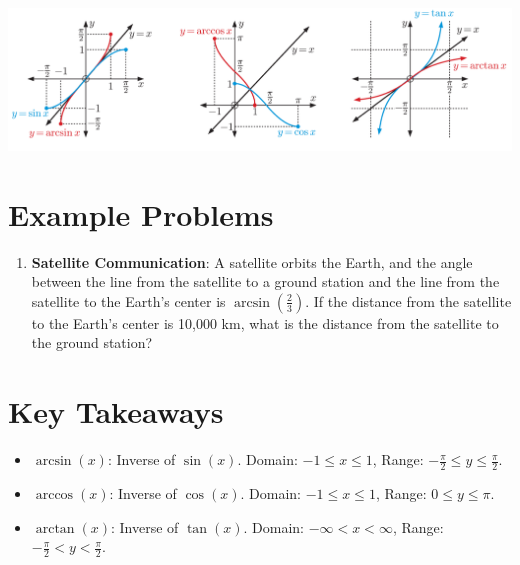 \documentclass{article}
\begin{document}
\begin{center}
\includegraphics[width=\textwidth]{Screenshot 2024-05-14 192525.png}
\end{center}

\section*{Example Problems}

\begin{enumerate}
    \item \textbf{Satellite Communication}: A satellite orbits the Earth, and the angle between the line from the satellite to a ground station and the line from the satellite to the Earth's center is \(\arcsin\left(\frac{2}{3}\right)\). If the distance from the satellite to the Earth's center is 10,000 km, what is the distance from the satellite to the ground station?
    
    \begin{tcolorbox}[colback=white, colframe=sectioncolor!50, width=\textwidth, height=2in, valign=center, halign=left]
    \end{tcolorbox}

\end{enumerate}

\section*{Key Takeaways}
\begin{definitionbox}
\begin{itemize}
    \item $\arcsin(x)$: Inverse of $\sin(x)$. Domain: $-1 \leq x \leq 1$, Range: $-\frac{\pi}{2} \leq y \leq \frac{\pi}{2}$.
    \item $\arccos(x)$: Inverse of $\cos(x)$. Domain: $-1 \leq x \leq 1$, Range: $0 \leq y \leq \pi$.
    \item $\arctan(x)$: Inverse of $\tan(x)$. Domain: $-\infty < x < \infty$, Range: $-\frac{\pi}{2} < y < \frac{\pi}{2}$.
\end{itemize}
\end{definitionbox}
\end{document}
